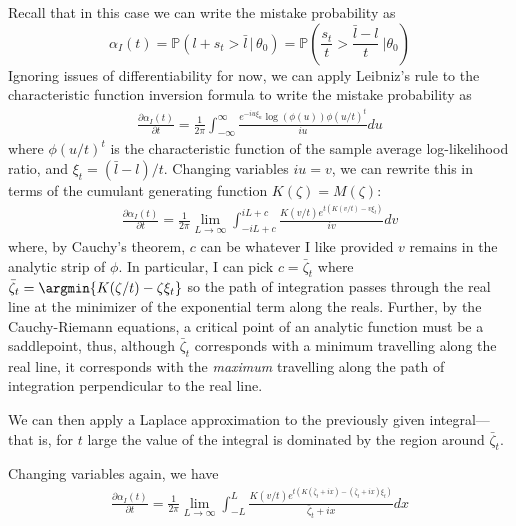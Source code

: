 \documentclass{fancyArticle}
\renewcommand{\|}{\,|\,}                    %
\providecommand{\;}{\,;}                    %
\begin{document}
\begin{appendix}
  Recall that in this case we can write the mistake probability as
  \begin{equation*}
    \alpha_I(t) = \mathbb{P}\left(
      l + s_t > \bar{l} \| \theta_0\right)
    = \mathbb{P}\left( \frac{s_t}{t} > \frac{\bar{l}-l}{t}\ \bigg| \theta_0\right)
  \end{equation*}
  Ignoring issues of differentiability for now, we can apply Leibniz's rule to the characteristic function inversion formula to write the mistake probability as
  \begin{align*}
    \frac{\partial \alpha_I(t)}{\partial t}
    =
    \frac{1}{2\pi} \int_{-\infty}^{\infty}
    \frac{e^{-iu\xi_n}\log(\phi(u))\phi(u/t)^t}{iu}du
  \end{align*}
  where $\phi(u/t)^t$ is the characteristic function of the sample average log-likelihood ratio, and $\xi_t=(\bar{l}-l)/t$.
  Changing variables $iu=v$, we can rewrite this in terms of the cumulant generating function $K(\zeta)=M(\zeta)$:
  \begin{align}
    \label{eq:derivative-inversion}
    \frac{\partial \alpha_I(t)}{\partial t} =
    \frac{1}{2\pi} \lim_{L\rightarrow\infty} \int_{-iL+c}^{iL+c}
    \frac{K(v/t)e^{t(K(v/t)-v\xi_t)}}{iv}dv
  \end{align}
  where, by Cauchy's theorem, $c$ can be whatever I like provided $v$ remains in the analytic strip of $\phi$.
  In particular, I can pick $c=\bar{\zeta}_t$ where $\bar{\zeta}_{t}=\argmin\{K(\zeta/t)-\zeta\xi_t\}$ so the path of integration passes through the real line at the minimizer of the exponential term along the reals.
  Further, by the Cauchy-Riemann equations, a critical point of an analytic function must be a saddlepoint, thus, although $\bar{\zeta}_t$ corresponds with a minimum travelling along the real line, it corresponds with the \textit{maximum} travelling along the path of integration perpendicular to the real line.

  We can then apply a Laplace approximation to the previously given integral---that is, for $t$ large the value of the integral is dominated by the region around $\bar{\zeta}_{t}$.

  Changing variables again, we have
  \begin{align*}
    \label{eq:derivative-inversion2}
    \frac{\partial \alpha_I(t)}{\partial t} =
    \frac{1}{2\pi} \lim_{L\rightarrow\infty} \int_{-L}^{L}
    \frac{K(v/t)e^{t(K(\bar{\zeta}_t+ix)-(\bar{\zeta}_t+ix)\xi_t)}}{\bar{\zeta}_t+ix}dx
  \end{align*}


\end{appendix}
\end{document}
